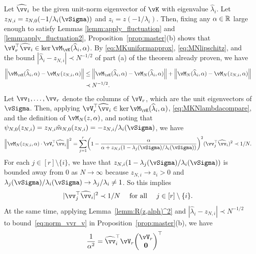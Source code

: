 \begin{proof-of-theorem}
Let $\widehat \vv_i$ be the given unit-norm eigenvector of $\vK$ with eigenvalue
$\widehat \lambda_i$. Let $z_{N,i}=z_{N,0}(-1/\lambda_i(\vSigma))$ and
$z_i=z(-1/\lambda_i)$.
Then, fixing any $\alpha \in \mathbb{R}$ large enough to satisfy Lemmas
\ref{lemm:apply_fluctuation} and \ref{lemm:apply_fluctuation2},
Proposition~\ref{prop:master}(b) shows that
	$\vV_r^\top\widehat{\vv}_i \in\ker
\vM_{\vK}(\widehat\lambda_i,\alpha)$.
By \eqref{eq:MKuniformapprox}, \eqref{eq:MNlipschitz}, and the bound $|\widehat
\lambda_i-z_{N,i}| \prec N^{-1/2}$ of part (a) of the theorem already proven,
we have
	\begin{align}
	\norm{\vM_{\vK}(\widehat\lambda_i,\alpha)-\vM_N(z_{N,i},\alpha)} &\le
\norm{\vM_{\vK}(\widehat\lambda_i,\alpha)-\vM_N(\widehat
\lambda_i,\alpha)}+\norm{\vM_N(\widehat\lambda_i,\alpha)-\vM_N(z_{N,i},\alpha)}
\nonumber\\
&\prec N^{-1/2}.\label{eq:MKNlambdacompare}
	\end{align}
Let $\vv_1,\ldots,\vv_r$ denote the columns of $\vV_r$, which are the unit
eigenvectors of $\vSigma$.
	Then, applying $\vV_r^\top\widehat{\vv}_i \in\ker
\vM_{\vK}(\widehat\lambda_i,\alpha)$, \eqref{eq:MKNlambdacompare}, and
the definition of $\vM_N(z,\alpha)$, and noting that
$\psi_{N,0}(z_{N,i})=z_{N,i}\tilde
m_{N,0}(z_{N,i})=-z_{N,i}/\lambda_i(\vSigma)$, we have
\[\norm{\vM_N(z_{N,i},\alpha) \cdot \vV_r^\top\widehat{\vv}_i}^2
=\sum_{j=1}^r
\left(1-\frac{\alpha}{\alpha+z_{N,i}(1-\lambda_j(\vSigma)/\lambda_i(\vSigma))}
\right)^2 (\vv_j^\top \widehat\vv_i)^2 \prec 1/N.\]
For each $j \in [r] \setminus \{i\}$, we have that
$z_{N,i}(1-\lambda_j(\vSigma)/\lambda_i(\vSigma))$ is bounded away from 0
as $N \to \infty$ because $z_{N,i} \to z_i>0$ and
$\lambda_j(\vSigma)/\lambda_i(\vSigma) \to \lambda_j/\lambda_i \neq 1$.
So this implies
	\begin{equation}\label{eq:y_q_j}
	|\vv^\top_j\widehat{\vv}_i|^2\prec 1/N\quad\text{ for all }\quad j\in [r]\setminus \{i\}.
	\end{equation}
	At the same time, applying Lemma~\ref{lemm:R(z,alph)^2} 
and $|\widehat \lambda_i-z_{N,i}| \prec N^{-1/2}$ to
bound~\eqref{eq:norm_vvr_v} in Proposition~\ref{prop:master}(b), we have 
\begin{align}
\frac{1}{\alpha^2}
&=\widehat\vv_i^\top \vV_r
\begin{pmatrix} \vV_r \\ \mathbf{0} \end{pmatrix}^\top

\end{align}
\end{proof-of-theorem}
